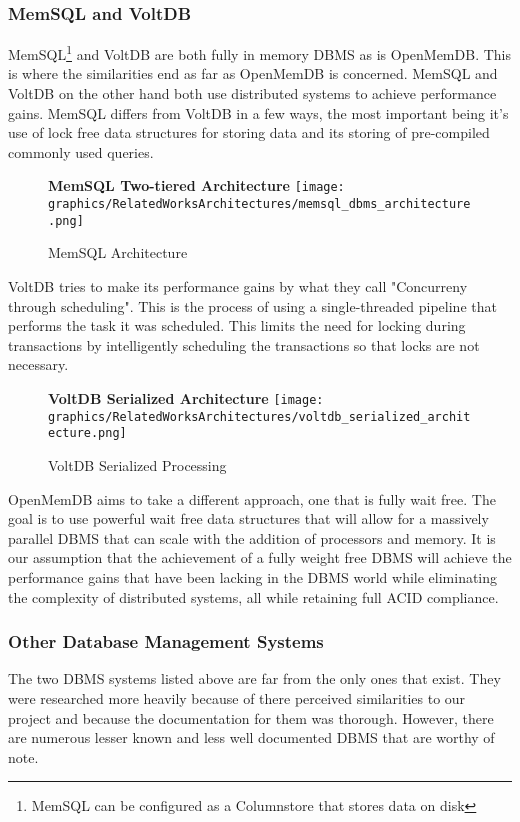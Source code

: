 \documentclass[letterpaper, 12pt]{article}
\renewcommand{\includegraphics}[2][]{\fbox{}}
\begin{document}
	\subsubsection{MemSQL and VoltDB}
	MemSQL\footnote{MemSQL can be configured as a Columnstore that stores data on disk}
	and VoltDB are both fully in memory DBMS as is OpenMemDB. This is where the
	similarities end as far as OpenMemDB is concerned. MemSQL and VoltDB on the other 
	hand both use distributed systems to achieve performance gains. MemSQL differs from 
	VoltDB in a few ways, the most important being it's use of lock free data structures
	for storing data and its storing of pre-compiled commonly used queries\cite{MemSQL}.
	\begin{figure}
	  \centering
	  \textbf{MemSQL Two-tiered Architecture}
	  \texttt{[image: graphics/RelatedWorksArchitectures/memsql\_dbms\_architecture.png]}
	  \caption{MemSQL Architecture}
	\end{figure}
	VoltDB tries to make its performance gains by what they call "Concurreny through
	scheduling"\cite{VoltDB}. This is the process of using a single-threaded pipeline 
	that performs the task it was scheduled. This limits the need for locking during
	transactions by intelligently scheduling the transactions so that locks are not
	necessary.
	\begin{figure}
	  \centering
	  \textbf{VoltDB Serialized Architecture}
	  \texttt{[image: graphics/RelatedWorksArchitectures/voltdb\_serialized\_architecture.png]}
	  \caption{VoltDB Serialized Processing}
	\end{figure}
	\par\vspace{\baselineskip}
	OpenMemDB aims to take a different approach, one that is fully wait free. The goal is 
	to use powerful wait free data structures that will allow for a massively parallel 
	DBMS that can scale with the addition of processors and memory. It is our assumption 
	that the achievement of a fully weight free DBMS will achieve the performance gains 
	that have been lacking in the DBMS world while eliminating the complexity of 
	distributed systems, all while retaining full ACID compliance.
	
	\subsubsection{Other Database Management Systems}
	The two DBMS systems listed above are far from the only ones that exist. They were
	researched more heavily because of there perceived similarities to our project and
	because the documentation for them was thorough. However, there are numerous lesser
	known and less well documented DBMS that are worthy of note.
\end{document}

